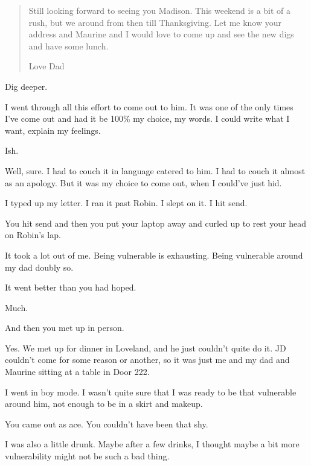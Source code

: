 \begin{paracol}{2}
\begin{leftcolumn}
\begin{quotation}
Still looking forward to seeing you Madison. This weekend is a bit of a rush, but we around from then till Thanksgiving. Let me know your address and Maurine and I would love to come up and see the new digs and have some lunch.

Love Dad
\end{quotation}

\begin{ally}
Dig deeper.
\end{ally}
\newpage

\noindent I went through all this effort to come out to him. It was one of the only times I've come out and had it be 100\% my choice, my words. I could write what I want, explain my feelings.

\begin{ally}
Ish.
\end{ally}
Well, sure. I had to couch it in language catered to him. I had to couch it almost as an apology. But it was my choice to come out, when I could've just hid.

I typed up my letter. I ran it past Robin. I slept on it. I hit send.

\begin{ally}
You hit send and then you put your laptop away and curled up to rest your head on Robin's lap.
\end{ally}
It took a lot out of me. Being vulnerable is exhausting. Being vulnerable around my dad doubly so.

\begin{ally}
It went better than you had hoped.
\end{ally}
Much.

\begin{ally}
And then you met up in person.
\end{ally}
Yes. We met up for dinner in Loveland, and he just couldn't quite do it. JD couldn't come for some reason or another, so it was just me and my dad and Maurine sitting at a table in Door 222.

I went in boy mode. I wasn't quite sure that I was ready to be that vulnerable around him, not enough to be in a skirt and makeup.

\begin{ally}
You came out as ace. You couldn't have been that shy.
\end{ally}
I was also a little drunk. Maybe after a few drinks, I thought maybe a bit more vulnerability might not be such a bad thing.


\end{leftcolumn}
\end{paracol}
